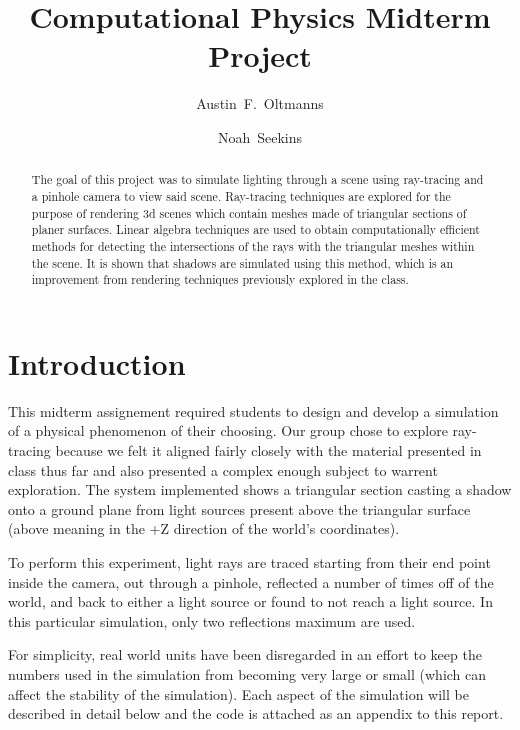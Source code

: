 \documentclass{article}
\begin{document}
\title{Computational Physics Midterm Project}
\author{
Austin~F.~Oltmanns
\and
Noah~Seekins
}

\maketitle

\begin{abstract}
The goal of this project was to simulate lighting through a scene using ray-tracing and a pinhole camera to view said scene.
Ray-tracing techniques are explored for the purpose of rendering 3d scenes which contain meshes made of
triangular sections of planer surfaces. Linear algebra techniques are used to obtain computationally 
efficient methods  for detecting the intersections of the rays with the triangular meshes within the scene.
It is shown that shadows are simulated using this method, which is an improvement 
from rendering techniques previously explored in the class.
\end{abstract} 

\section{Introduction}
This midterm assignement required students to design and develop a simulation of a physical phenomenon 
of their choosing. Our group chose to explore ray-tracing because we felt it aligned fairly closely with the 
material presented in class thus far and also presented a complex enough subject to warrent exploration.
The system implemented shows a triangular section casting a shadow onto a ground plane from light sources
present above the triangular surface (above meaning in the +Z direction of the world's coordinates).

To perform this experiment, light rays are traced starting from their end point inside the camera, out through
a pinhole, reflected a number of times off of the world, and back to either a light source or found to not 
reach a light source. In this particular simulation, only two reflections maximum are used.

For simplicity, real world units have been disregarded in an effort to keep the numbers used in the simulation from 
becoming very large or small (which can affect the stability of the simulation).
Each aspect of the simulation will be described in detail below and the code is attached as an appendix to this report.
\end{document}
